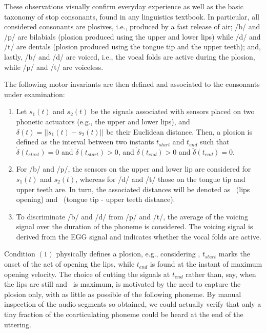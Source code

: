 These observations visually confirm everyday experience as well as
the basic taxonomy of stop consonants, found in any linguistics textbook.
In particular, all considered consonants are plosives,
i.e., produced by a fast release of air; /b/ and /p/ are bilabials
(plosion produced using the upper and lower lips) while /d/ and /t/ are
dentals (plosion produced using the tongue tip and the upper teeth);
and, lastly, /b/ and /d/ are voiced, i.e., the vocal folds are active during
the plosion, while /p/ and /t/ are voiceless.

The following motor invariants are then defined and associated to the
consonants under examination:

\begin{enumerate}

  \item Let $s_1(t)$ and $s_2(t)$ be the signals associated
    with sensors placed on two phonetic actuators (e.g., the upper and
    lower lips), and $\delta(t) = ||s_1(t)-s_2(t)||$ be their
    Euclidean distance. Then, a plosion is defined as the interval
    between two instants $t_{start}$ and $t_{end}$ such that
    $\dot{\delta}(t_{start}) = 0 $ and $\ddot{\delta}(t_{start}) > 0$,
    and $\dot{\delta}(t_{end}) > 0 $ and $\ddot{\delta}(t_{end}) = 0$.

  \item For /b/ and /p/, the sensors on the upper and lower
    lip are considered for $s_1(t)$ and $s_2(t)$, whereas for /d/ and /t/
    those on the tongue tip and upper teeth are. In turn, the associated
    distances will be denoted as \lio\ (lips opening) and \ttu\
    (tongue tip - upper teeth distance).

  \item To discriminate /b/ and /d/ from /p/ and /t/, the average of the
    voicing signal over the duration of the phoneme is considered. The
    voicing signal is derived from the EGG signal and indicates
    whether the vocal folds are active.

\end{enumerate}

Condition $(1)$ physically defines a plosion, e.g., considering \lio, $t_{start}$
marks the onset of the act of opening the lips, while $t_{end}$ is found at the
instant of maximum opening velocity. The choice of cutting the signals at $t_{end}$
rather than, say, when the lips are still and \lio\ is maximum, is motivated by
the need to capture the plosion only, with as little as possible of the following
phoneme. By manual inspection of the audio segments so obtained, we could actually
verify that only a tiny fraction of the coarticulating phoneme could be heard
at the end of the uttering.

